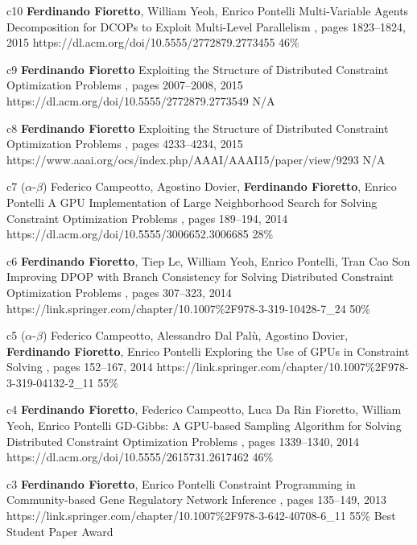 \begin{pubs}
	\confentry
		{c10} %
		{{\bf Ferdinando Fioretto}, William Yeoh, Enrico Pontelli}
		{Multi-Variable Agents Decomposition for DCOPs to Exploit Multi-Level Parallelism}
		{\procAAMAS, pages 1823--1824, 2015}
		{https://dl.acm.org/doi/10.5555/2772879.2773455}
		{46\%}

	\confentry
		{c9} %
		{{\bf Ferdinando Fioretto}}
		{Exploiting the Structure of Distributed Constraint Optimization Problems} 
		{\procAAMAS, pages 2007--2008, 2015}
		{https://dl.acm.org/doi/10.5555/2772879.2773549}
		{N/A}

	\confentry
		{c8} %
		{{\bf Ferdinando Fioretto}} 
		{Exploiting the Structure of Distributed Constraint Optimization Problems}
		{\procAAAI,  pages 4233--4234, 2015}
		{https://www.aaai.org/ocs/index.php/AAAI/AAAI15/paper/view/9293}
		{N/A}

	\confentry 
		{c7} %
		{($\alpha$-$\beta$) 
		Federico Campeotto, Agostino Dovier, {\bf Ferdinando Fioretto}, Enrico Pontelli}
		{A GPU Implementation of Large Neighborhood Search for Solving Constraint Optimization Problems} 
		{\procECAI, pages 189--194, 2014}
		{https://dl.acm.org/doi/10.5555/3006652.3006685}
		{28\%}

	\confentry
		{c6} %
		{{\bf Ferdinando Fioretto}, Tiep Le, William Yeoh, Enrico Pontelli, Tran Cao Son}
		{Improving DPOP with Branch Consistency for Solving Distributed Constraint Optimization Problems}
		{\procCP, pages 307--323, 2014}
		{https://link.springer.com/chapter/10.1007\%2F978-3-319-10428-7\_24}
		{50\%}
		
	\confentry
		{c5} %
		{($\alpha$-$\beta$) 
		Federico Campeotto, Alessandro Dal Pal\`{u}, Agostino Dovier, {\bf Ferdinando Fioretto}, Enrico Pontelli}
		{Exploring the Use of GPUs in Constraint Solving}
		{\procPADL, pages 152--167, 2014}
		{https://link.springer.com/chapter/10.1007\%2F978-3-319-04132-2\_11}
		{55\%}

	\confentry 
		{c4} %
		{{\bf Ferdinando Fioretto}, Federico Campeotto, Luca Da Rin Fioretto, William Yeoh, Enrico Pontelli} 
		{GD-Gibbs: A GPU-based Sampling Algorithm for Solving Distributed Constraint Optimization Problems} %
		{\procAAMAS, pages 1339--1340, 2014}
		{https://dl.acm.org/doi/10.5555/2615731.2617462}
		{46\%}
	
	\confentryAwd
		{c3} %
		{{\bf Ferdinando Fioretto}, Enrico Pontelli} 
		{Constraint Programming in Community-based Gene Regulatory Network Inference} 
		{\procCMSB, pages 135--149, 2013}
		{https://link.springer.com/chapter/10.1007\%2F978-3-642-40708-6\_11}
		{55\%}
		{Best Student Paper Award}{}


\end{pubs}
